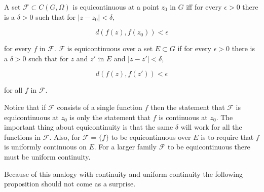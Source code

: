 A set $\mathcal{F} \subset C(G, \Omega)$ is equicontinuous at a point $z_0$ in $G$ iff for every $\epsilon > 0$ there is a $\delta > 0$ such that for $|z - z_0| < \delta$,

$$d(f(z), f(z_0)) < \epsilon$$

for every $f$ in $\mathcal{F}$. $\mathcal{F}$ is equicontinuous over a set $E \subset G$ if for every $\epsilon > 0$ there is a $\delta > 0$ such that for $z$ and $z'$ in $E$ and $|z - z'| < \delta$,

$$d(f(z), f(z')) < \epsilon$$

for all $f$ in $\mathcal{F}$.

Notice that if $\mathcal{F}$ consists of a single function $f$ then the statement that $\mathcal{F}$ is equicontinuous at $z_0$ is only the statement that $f$ is continuous at $z_0$. The important thing about equicontinuity is that the same $\delta$ will work for all the functions in $\mathcal{F}$. Also, for $\mathcal{F} = \{f\}$ to be equicontinuous over $E$ is to require that $f$ is uniformly continuous on $E$. For a larger family $\mathcal{F}$ to be equicontinuous there must be uniform continuity.

Because of this analogy with continuity and uniform continuity the following proposition should not come as a surprise.